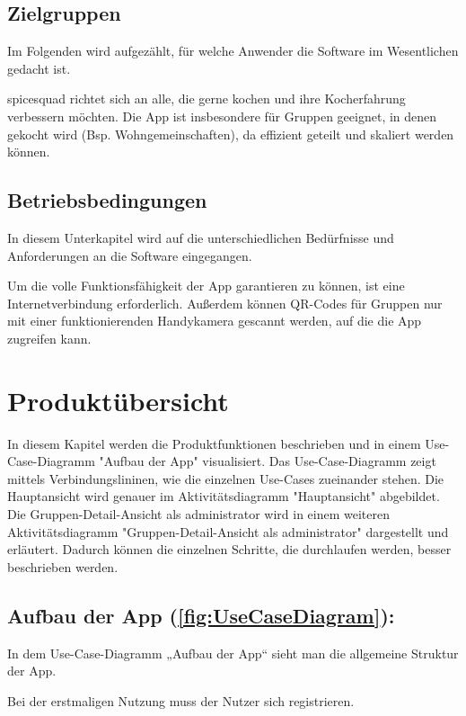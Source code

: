 \documentclass[parskip=full]{scrartcl}
\begin{document}
\subsection{Zielgruppen}
Im Folgenden wird aufgezählt, für welche Anwender die Software im Wesentlichen gedacht ist. \par
\gls{spicesquad} richtet sich an alle, die gerne kochen und ihre Kocherfahrung verbessern möchten.
Die App ist insbesondere für Gruppen geeignet, in denen gekocht wird (Bsp. Wohngemeinschaften), da  effizient geteilt und skaliert werden können.

\subsection{Betriebsbedingungen}
In diesem Unterkapitel wird auf die unterschiedlichen Bedürfnisse und Anforderungen an die Software eingegangen. \par
Um die volle Funktionsfähigkeit der App garantieren zu können, ist eine Internetverbindung erforderlich. Außerdem können QR-Codes für Gruppen nur mit einer funktionierenden Handykamera gescannt werden, auf die die App zugreifen kann.

\newpage
\section{Produktübersicht}

In diesem Kapitel werden die Produktfunktionen beschrieben und in einem Use-Case-Diagramm "Aufbau der App" visualisiert.
Das Use-Case-Diagramm zeigt mittels Verbindungslininen, wie die einzelnen Use-Cases zueinander stehen.
Die Hauptansicht wird genauer im Aktivitätsdiagramm "Hauptansicht" abgebildet.
Die Gruppen-Detail-Ansicht als \gls{administrator} wird in einem weiteren Aktivitätsdiagramm "Gruppen-Detail-Ansicht als \gls{administrator}" dargestellt und erläutert.
Dadurch können die einzelnen Schritte, die durchlaufen werden, besser beschrieben werden.\par


\subsection{Aufbau der App (\autoref{fig:UseCaseDiagram}):}

In dem Use-Case-Diagramm „Aufbau der App“ sieht man die allgemeine Struktur der App.

Bei der erstmaligen Nutzung muss der Nutzer sich registrieren.
\end{document}
